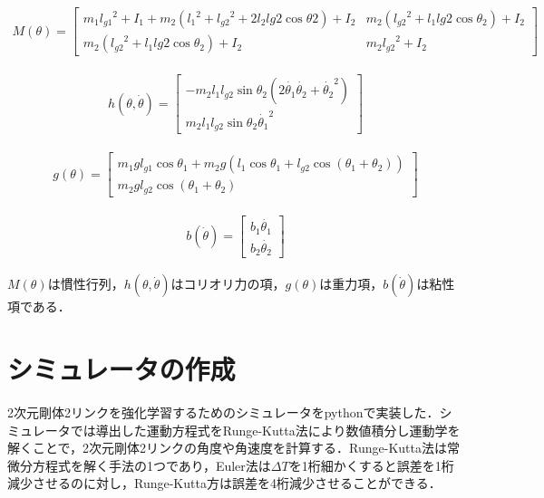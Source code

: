 \begin{align}
  M(\theta)= 
            \begin{bmatrix}
              m_{1}{l_{g1}}^2 + I_{1} + m_{2}({l_{1}}^2 + {l_{g2}}^2 + 2l_{2}l{g2}\cos\theta{2}) + I_{2} & m_{2}({l_{g2}}^2 + l_{1}l{g2}\cos\theta_{2}) + I_{2} \\
              m_{2}({l_{g2}}^2 + l_{1}l{g2}\cos\theta_{2}) + I_{2} & m_{2}{l_{g2}}^2 + I_{2}
            \end{bmatrix}
\end{align}

\begin{eqnarray}
  h(\theta, \dot{\theta})=
            \begin{bmatrix}
              -m_{2}l_{1}l_{g2}\sin\theta_{2}(2\dot{\theta_{1}}\dot{\theta_{2}} + {\dot{\theta_{2}}}^2) \\
              m_{2}l_{1}l_{g2}\sin\theta_{2}{\dot{\theta_{1}}}^2
            \end{bmatrix}
\end{eqnarray}

\begin{eqnarray}
  g(\theta)=
            \begin{bmatrix}
              m_{1}gl_{g1}\cos\theta_{1} + m_{2}g(l_{1}\cos\theta_{1} + l_{g2}\cos(\theta_{1} + \theta_{2})) \\
              m_{2}gl_{g2}\cos(\theta_{1} + \theta_{2})
            \end{bmatrix}
\end{eqnarray}

\begin{eqnarray}
  b(\dot{\theta})=
            \begin{bmatrix}
              b_{1}\dot{\theta_{1}} \\
              b_{2}\dot{\theta_{2}}
            \end{bmatrix}
\end{eqnarray}

$M(\theta)$は慣性行列，$h(\theta, \dot{\theta})$はコリオリ力の項，$g(\theta)$は重力項，$b(\dot{\theta})$は粘性項である．

\section{シミュレータの作成}
2次元剛体2リンクを強化学習するためのシミュレータをpythonで実装した．シミュレータでは導出した運動方程式をRunge-Kutta法\cite{runge-kutta}により数値積分し運動学を解くことで，2次元剛体2リンクの角度や角速度を計算する．Runge-Kutta法は常微分方程式を解く手法の1つであり，Euler法は$\Delta T$を1桁細かくすると誤差を1桁減少させるのに対し，Runge-Kutta方は誤差を4桁減少させることができる．
